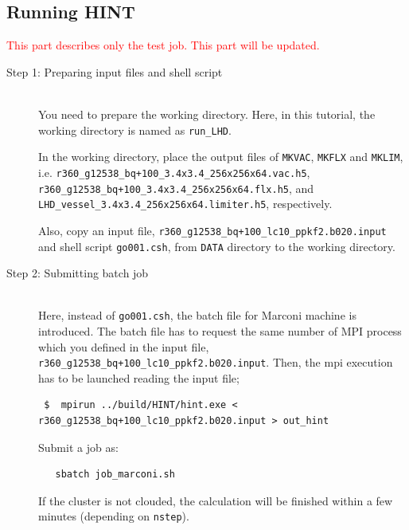 \documentclass[10pt]{ltxdoc} %
\begin{document}
\subsection{Running HINT}

\textcolor{red}{This part describes only the test job. This part will be updated.}

\begin{description}

 \item[Step 1: Preparing input files and shell script]\mbox{}\\
  You need to prepare the working directory. 
  Here, in this tutorial, the working directory is named as \texttt{run\_LHD}. 

  In the working directory, place the output files of \texttt{MKVAC}, \texttt{MKFLX} and \texttt{MKLIM}, i.e. \texttt{r360\_g12538\_bq+100\_3.4x3.4\_256x256x64.vac.h5}, \texttt{r360\_g12538\_bq+100\_3.4x3.4\_256x256x64.flx.h5}, and \texttt{LHD\_vessel\_3.4x3.4\_256x256x64.limiter.h5}, respectively.  

  Also, copy an input file, \texttt{r360\_g12538\_bq+100\_lc10\_ppkf2.b020.input} and shell script \texttt{go001.csh}, from \texttt{DATA} directory to the working directory. 
  

 \item[Step 2: Submitting batch job]\mbox{}\\

 Here, instead of \texttt{go001.csh}, the batch file for Marconi machine is introduced. 
 The batch file has to request the same number of MPI process which you defined in the input file, \texttt{r360\_g12538\_bq+100\_lc10\_ppkf2.b020.input}. Then, the mpi execution has to be launched reading the input file;
 \begin{verbatim}
 $  mpirun ../build/HINT/hint.exe < r360_g12538_bq+100_lc10_ppkf2.b020.input > out_hint
\end{verbatim}
  
  Submit a job as:
  \begin{verbatim}
   sbatch job_marconi.sh
  \end{verbatim}
  If the cluster is not clouded, the calculation will be finished within a few minutes (depending on \texttt{nstep}).
\end{description}
\end{document}
